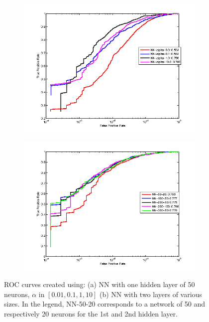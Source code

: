 \begin{figure}[h]
  \centering
  \begin{subfigure}[b]{0.49\textwidth}
   \includegraphics[width=\textwidth]{figures/NN-alpha.png}
    \caption{}
    \label{fig:NNa}
  \end{subfigure}
  \begin{subfigure}[b]{0.49\textwidth}
    \includegraphics[width=\textwidth]{figures/NN-2layers.png}
    \caption{}
    \label{fig:NNb}
  \end{subfigure}
  \caption{ROC curves created using: (a) NN with one hidden layer of 50 neurons, $\alpha$ in $[0.01,0.1,1,10]$ (b) NN with two layers of various sizes. In the legend, NN-50-20 corresponds to a network of 50 and respectively 20  neurons for the 1st and 2nd hidden layer.}
\end{figure}

